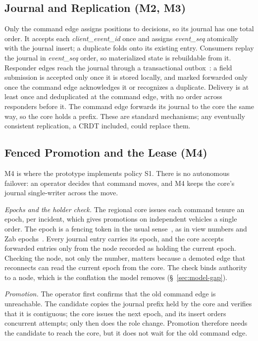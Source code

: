 \subsection{Journal and Replication (M2, M3)}
\label{sec:protocol-m2}
\label{sec:protocol-m3}

Only the command edge assigns positions to decisions, so its journal has one total
order. It accepts each \textit{client\_event\_id} once and assigns \textit{event\_seq}
atomically with the journal insert; a duplicate folds onto its existing entry. Consumers
replay the journal in \textit{event\_seq} order, so materialized state is rebuildable
from it. Responder edges reach the journal through a transactional
outbox~\cite{richardson2018microservices}: a field submission is accepted only once it is
stored locally, and marked forwarded only once the command edge acknowledges it or
recognizes a duplicate. Delivery is at least once and deduplicated at the command edge,
with no order across responders before it. The command edge forwards its journal to the
core the same way, so the core holds a prefix. These are standard mechanisms; any
eventually consistent replication, a CRDT included, could replace them.

\subsection{Fenced Promotion and the Lease (M4)}
\label{sec:protocol-m4}

M4 is where the prototype implements policy S1. There is no autonomous failover: an
operator decides that command moves, and M4 keeps the core's journal single-writer
across the move.

\textit{Epochs and the holder check.} The regional core issues each command tenure an
epoch, per incident, which gives promotions on independent vehicles a single order. The
epoch is a fencing token in the usual sense~\cite{kleppmann2017ddia}, as in view numbers
and Zab epochs~\cite{oki1988viewstamped,junqueira2011zab}. Every journal entry carries
its epoch, and the core accepts forwarded entries only from the node recorded as holding
the current epoch. Checking the node, not only the number, matters because a demoted edge
that reconnects can read the current epoch from the core. The check binds authority to a
node, which is the conflation the model removes (\S~\ref{sec:model-gap}).

\textit{Promotion.} The operator first confirms that the old command edge is
unreachable. The candidate copies the journal prefix held by the core and verifies that
it is contiguous; the core issues the next epoch, and its insert orders concurrent
attempts; only then does the role change. Promotion therefore needs the candidate to
reach the core, but it does not wait for the old command edge.


